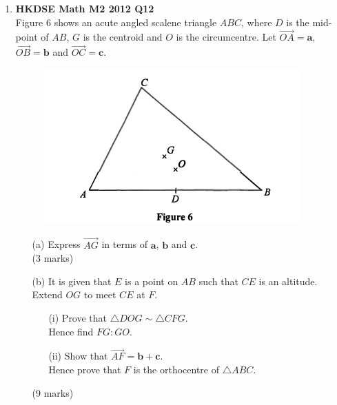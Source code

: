 \documentclass[12pt]{article}
\begin{document}
\begin{enumerate}
	\item \textbf{HKDSE Math M2 2012 Q12}\\
	Figure 6 shows an acute angled scalene triangle $ABC$, where $D$ is the mid-point of $AB$, $G$ is the centroid and $O$ is the circumcentre. Let $\overrightarrow{OA} = \textbf{a}$, $\overrightarrow{OB} = \textbf{b}$ and $\overrightarrow{OC} = \textbf{c}$.
	\begin{figure}[H]
		\centering
		\includegraphics[width = .5\linewidth]{2012Figure6}
	\end{figure}
	\begin{enumerate}
		\item [(a)]Express $\overrightarrow{AG}$ in terms of $\textbf{a}$, $\textbf{b}$ and $\textbf{c}$.\\(3 marks)
		\item [(b)]It is given that $E$ is a point on $AB$ such that $CE$ is an altitude. Extend $OG$ to meet $CE$ at $F$. 
		\begin{enumerate}
			\item [(i)]Prove that $\triangle DOG \sim \triangle CFG$. \\Hence find $FG:GO$. 
			\item [(ii)]Show that $\overrightarrow{AF} = \textbf{b} + \textbf{c}$. \\Hence prove that $F$ is the orthocentre of $\triangle ABC$.
		\end{enumerate}
		(9 marks)
	\end{enumerate}


\end{enumerate}
\end{document}

